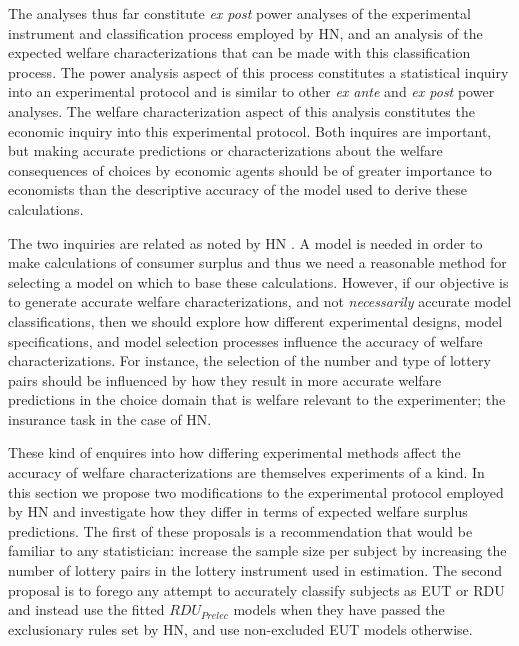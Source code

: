 \documentclass[../main.tex]{subfiles}
\begin{document}
The analyses thus far constitute \textit{ex post} power analyses of the experimental instrument and classification process employed by HN, and an analysis of the expected welfare characterizations that can be made with this classification process.
The power analysis aspect of this process constitutes a statistical inquiry into an experimental protocol and is similar to other \textit{ex ante} and \textit{ex post} power analyses.
The welfare characterization aspect of this analysis constitutes the economic inquiry into this experimental protocol.
Both inquires are important, but making accurate predictions or characterizations about the welfare consequences of choices by economic agents should be of greater importance to economists than the descriptive accuracy of the model used to derive these calculations.{\footnotemark}

\addtocounter{footnote}{-1}

The two inquiries are related as noted by HN \parencite*[105]{Harrison2016}.
A model is needed in order to make calculations of consumer surplus and thus we need a reasonable method for selecting a model on which to base these calculations.
However, if our objective is to generate accurate welfare characterizations, and not \textit{necessarily} accurate model classifications, then we should explore how different experimental designs, model specifications, and model selection processes influence the accuracy of welfare characterizations.
For instance, the selection of the number and type of lottery pairs should be influenced by how they result in more accurate welfare predictions in the choice domain that is welfare relevant to the experimenter; the insurance task in the case of HN.

These kind of enquires into how differing experimental methods affect the accuracy of welfare characterizations are themselves experiments of a kind.
In this section we propose two modifications to the experimental protocol employed by HN and investigate how they differ in terms of expected welfare surplus predictions.
The first of these proposals is a recommendation that would be familiar to any statistician: increase the sample size per subject by increasing the number of lottery pairs in the lottery instrument used in estimation.
The second proposal is to forego any attempt to accurately classify subjects as EUT or RDU and instead use the fitted $\mathit{RDU_{Prelec}}$ models when they have passed the exclusionary rules set by HN, and use non-excluded EUT models otherwise.
\end{document}

